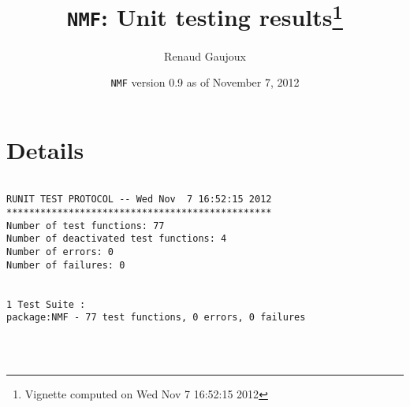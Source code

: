 \documentclass[10pt]{article}
\author{Renaud Gaujoux}
\title{\texttt{NMF}: Unit testing results\footnote{Vignette computed  on Wed Nov  7 16:52:15 2012}}
\date{\texttt{NMF} version 0.9 as of November  7, 2012}
\begin{document}
\maketitle

\section{Details}
\begin{verbatim}

RUNIT TEST PROTOCOL -- Wed Nov  7 16:52:15 2012 
*********************************************** 
Number of test functions: 77 
Number of deactivated test functions: 4 
Number of errors: 0 
Number of failures: 0 

 
1 Test Suite : 
package:NMF - 77 test functions, 0 errors, 0 failures




\end{verbatim}
\end{document}
